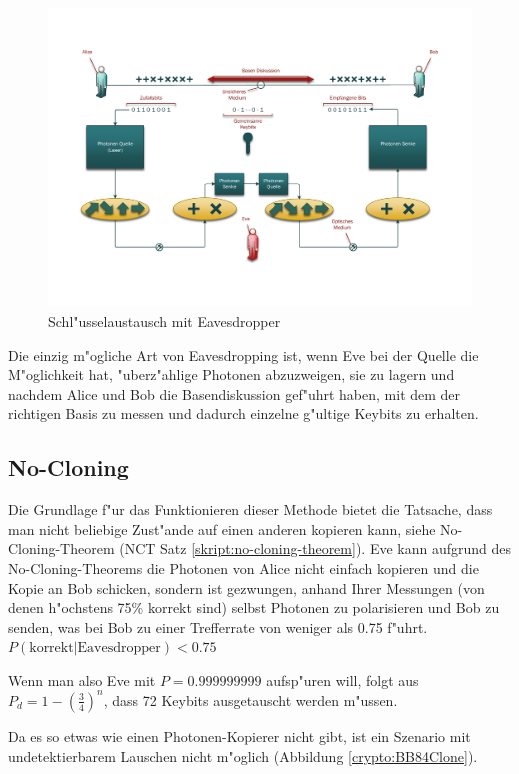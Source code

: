   \begin{figure}
    \centering
    \includegraphics[height=0.45\textheight]{crypto/BB84Eve.pdf}
    \caption{Schl"usselaustausch mit Eavesdropper\label{crypto:BB84Eve}}
  \end{figure}

  Die einzig m"ogliche Art von Eavesdropping ist, wenn Eve bei der Quelle die M"oglichkeit hat, "uberz"ahlige Photonen abzuzweigen,
  sie zu lagern und nachdem Alice und Bob die Basendiskussion gef"uhrt haben,
  mit dem der richtigen Basis zu messen und dadurch einzelne g"ultige Keybits zu erhalten.

  \subsection{No-Cloning}
  Die Grundlage f"ur das Funktionieren dieser Methode bietet die Tatsache, dass man nicht beliebige Zust"ande auf einen anderen kopieren kann, siehe No-Cloning-Theorem (NCT Satz \ref{skript:no-cloning-theorem}).
  Eve kann aufgrund des No-Cloning-Theorems die Photonen von Alice nicht einfach kopieren und die Kopie an Bob schicken,
  sondern ist gezwungen, anhand Ihrer Messungen (von denen h"ochstens 75\% korrekt sind) selbst Photonen zu polarisieren
  und Bob zu senden, was bei Bob zu einer Trefferrate von weniger als 0.75 f"uhrt.
  $P(\text{korrekt}|\text{Eavesdropper})<0.75$

  Wenn man also Eve mit $P=0.999999999$ aufsp"uren will,
  folgt aus $P_d = 1 - \left(\frac{3}{4}\right)^n$,
  dass 72 Keybits ausgetauscht werden m"ussen.

  Da es so etwas wie einen Photonen-Kopierer nicht gibt, ist ein Szenario mit undetektierbarem Lauschen nicht m"oglich (Abbildung \ref{crypto:BB84Clone}).

